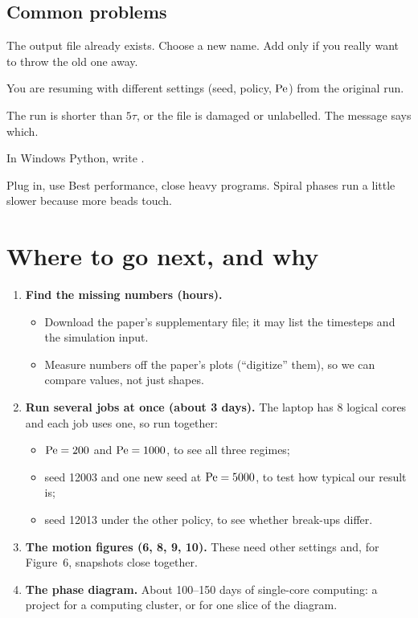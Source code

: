 \subsection{Common problems}
\begin{description}[style=nextline]
\item[``FileExistsError''] The output file already exists. Choose a new name. Add  only if you really want to throw the old one away.
\item[``fingerprint mismatch''] You are resuming with different settings (seed, policy, $\mathrm{Pe}$) from the original run.
\item[The verdict says ``refused''] The run is shorter than $5\tau$, or the file is damaged or unlabelled. The message says which.
\item[A path like \code{/c/Users} creates odd folders] In Windows Python, write .
\item[It is slow] Plug in, use Best performance, close heavy programs. Spiral phases run a little slower because more beads touch.
\end{description}

\section{Where to go next, and why}
\begin{enumerate}
\item \textbf{Find the missing numbers (hours).}
\begin{itemize}
\item Download the paper's supplementary file; it may list the timesteps and the simulation input.
\item Measure numbers off the paper's plots (``digitize'' them), so we can compare values, not just shapes.
\end{itemize}
\item \textbf{Run several jobs at once (about 3 days).} The laptop has 8 logical cores and each job uses one, so run together:
\begin{itemize}
\item $\mathrm{Pe}=200$ and $\mathrm{Pe}=1000$, to see all three regimes;
\item seed 12003 and one new seed at $\mathrm{Pe}=5000$, to test how typical our result is;
\item seed 12013 under the other policy, to see whether break-ups differ.
\end{itemize}
\item \textbf{The motion figures (6, 8, 9, 10).} These need other settings and, for Figure~6, snapshots close together.
\item \textbf{The phase diagram.} About 100--150 days of single-core computing: a project for a computing cluster, or for one slice of the diagram.
\end{enumerate}

